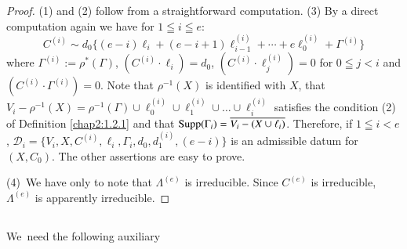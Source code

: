 \begin{proof}
(1) and (2) follow from a straightforward computation. (3) By a direct
  computation again we have for $1\leqq i\leqq e$:
$$
C^{(i)}\sim d_{0}\{(e-i)\ell_{i}+(e-i+1)\ell^{(i)}_{i-1}+\cdots+e\ell_{0}^{(i)}+\Gamma^{(i)}\}
$$
where $\Gamma^{(i)}:=\rho^{\ast}(\Gamma)$,
$(C^{(i)}\cdot\ell_{i})=d_{0}$, $(C^{(i)}\cdot\ell^{(i)}_{j})=0$ for
$0\leqq j<i$ and $(C^{(i)}\cdot \Gamma^{(i)})=0$. Note that
$\rho^{-1}(X)$ is identified with $X$, that
$V_{i}-\rho^{-1}(X)=\rho^{-1}(\Gamma)\cup \ell^{(i)}_{0}\cup
\ell^{(i)}_{1}\cup\ldots\cup\ell^{(i)}_{i}$ satisfies the condition
(2) of Definition \ref{chap2:1.2.1} and that
$\operatorname{Supp}(\Gamma_{i})=\overline{V_{i}-(X\cup \ell_{i})}$. Therefore, if
$1\leqq i<e$,
$\mathscr{D}_{i}=\{V_{i},X,C^{(i)},\ell_{i},\Gamma_{i},d_{0},d^{(i)}_{1},(e-i)\}$
is an admissible datum for $(X,C_{0})$. The other assertions are easy
to prove.

(4)~We have only to note that $\Lambda^{(e)}$ is irreducible. Since
$C^{(e)}$ is irreducible, $\Lambda^{(e)}$ is apparently
irreducible.
\end{proof}

\subsection{}\label{chap2:1.8}
We\pageoriginale\ need the following auxiliary

